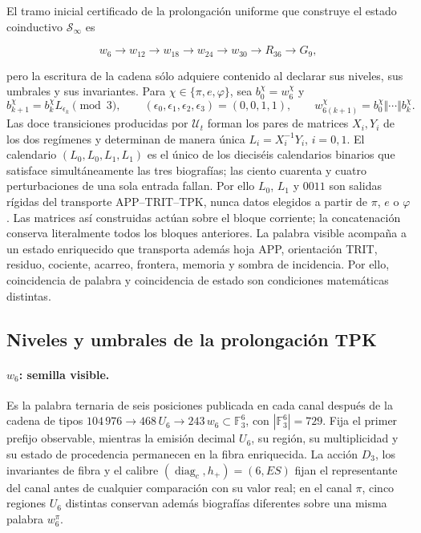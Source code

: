 El tramo inicial certificado de la prolongación uniforme que construye el
estado coinductivo \(\mathcal S_\infty\) es

\[
w_6\longrightarrow w_{12}\longrightarrow w_{18}\longrightarrow w_{24}
\longrightarrow w_{30}\longrightarrow R_{36}\longrightarrow G_9,
\]

pero la escritura de la cadena sólo adquiere contenido al declarar sus
niveles, sus umbrales y sus invariantes. Para
\(\chi\in\{\pi,e,\varphi\}\), sea \(b_0^\chi=w_6^\chi\) y
\[
 b_{k+1}^\chi=b_k^\chi L_{\epsilon_k}\pmod 3,
 \qquad
 (\epsilon_0,\epsilon_1,\epsilon_2,\epsilon_3)=(0,0,1,1),
 \qquad
 w_{6(k+1)}^\chi=b_0^\chi\Vert\cdots\Vert b_k^\chi.
\]
Las doce transiciones producidas por \(\mathcal U_t\) forman los pares de
matrices \(X_i,Y_i\) de los dos regímenes y determinan de manera única
\(L_i=X_i^{-1}Y_i\), \(i=0,1\). El calendario
\((L_0,L_0,L_1,L_1)\) es el único de los dieciséis calendarios binarios que
satisface simultáneamente las tres biografías; las ciento cuarenta y cuatro
perturbaciones de una sola entrada fallan. Por ello \(L_0\), \(L_1\) y
\(0011\) son salidas rígidas del transporte APP--TRIT--TPK, nunca datos
elegidos a partir de \(\pi\), \(e\) o \(\varphi\). Las matrices así
construidas actúan sobre el bloque corriente; la concatenación conserva
literalmente todos los bloques anteriores. La palabra visible acompaña a un estado enriquecido que transporta
además hoja APP, orientación TRIT, residuo, cociente, acarreo, frontera,
memoria y sombra de incidencia. Por ello, coincidencia de palabra y
coincidencia de estado son condiciones matemáticas distintas.

\subsection*{Niveles y umbrales de la prolongación TPK}
\label{sec:umbrales-prolongacion-tpk-inaugural}

\paragraph{\(w_6\): semilla visible.}
Es la palabra ternaria de seis posiciones publicada en cada canal después de
la cadena de tipos
\(104\,976\to468\,U_6\to243\,w_6\subset\mathbb F_3^6\), con
\(|\mathbb F_3^6|=729\).
Fija el primer prefijo observable, mientras la emisión decimal \(U_6\), su
región, su multiplicidad y su estado de procedencia permanecen en la fibra
enriquecida. La acción \(D_3\), los invariantes de fibra y el calibre
\((\operatorname{diag}_c,h_+)=(6,ES)\) fijan el representante del canal antes
de cualquier comparación con su valor real; en el canal \(\pi\), cinco
regiones \(U_6\) distintas conservan además biografías diferentes sobre una
misma palabra \(w_6^\pi\).

